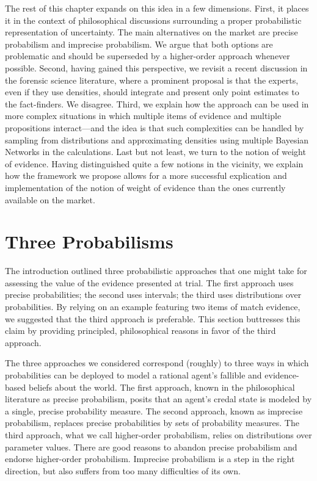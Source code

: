 \documentclass[
  10pt,
  dvipsnames,enabledeprecatedfontcommands]{scrartcl}
\begin{document}

The rest of this chapter expands on this idea in a few dimensions.
First, it places it in the context of philosophical discussions
surrounding a proper probabilistic representation of uncertainty. The
main alternatives on the market are precise probabilism and imprecise
probabilism. We argue that both options are problematic and should be
superseded by a higher-order approach whenever possible. Second, having
gained this perspective, we revisit a recent discussion in the forensic
science literature, where a prominent proposal is that the experts, even
if they use densities, should integrate and present only point estimates
to the fact-finders. We disagree. Third, we explain how the approach can
be used in more complex situations in which multiple items of evidence
and multiple propositions interact---and the idea is that such
complexities can be handled by sampling from distributions and
approximating densities using multiple Bayesian Networks in the
calculations. Last but not least, we turn to the notion of weight of
evidence. Having distinguished quite a few notions in the vicinity, we
explain how the framework we propose allows for a more successful
explication and implementation of the notion of weight of evidence than
the ones currently available on the market.

\hypertarget{three-probabilisms}{%
\section{Three Probabilisms}\label{three-probabilisms}}

The introduction outlined three probabilistic approaches that one might
take for assessing the value of the evidence presented at trial. The
first approach uses precise probabilities; the second uses intervals;
the third uses distributions over probabilities. By relying on an
example featuring two items of match evidence, we suggested that the
third approach is preferable. This section buttresses this claim by
providing principled, philosophical reasons in favor of the third
approach.

The three approaches we considered correspond (roughly) to three ways in
which probabilities can be deployed to model a rational agent's fallible
and evidence-based beliefs about the world. The first approach, known in
the philosophical literature as precise probabilism, posits that an
agent's credal state is modeled by a single, precise probability
measure. The second approach, known as imprecise probabilism, replaces
precise probabilities by sets of probability measures. The third
approach, what we call higher-order probabilism, relies on distributions
over parameter values. There are good reasons to abandon precise
probabilism and endorse higher-order probabilism. Imprecise probabilism
is a step in the right direction, but also suffers from too many
difficulties of its own.
\end{document}

